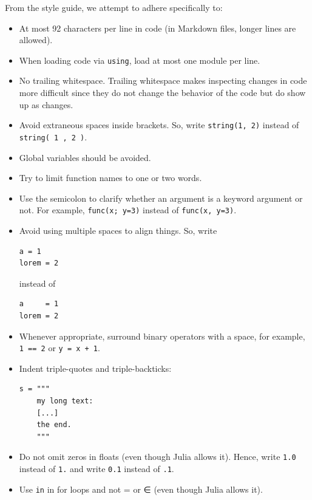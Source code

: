 \documentclass[
  notoc %
]{tufte-book}
\newcommand{\passthrough}[1]{#1}
\begin{document}
From the style guide, we attempt to adhere specifically to:

\begin{itemize}
\item
  At most 92 characters per line in code (in Markdown files, longer
  lines are allowed).
\item
  When loading code via \passthrough{\lstinline!using!}, load at most
  one module per line.
\item
  No trailing whitespace. Trailing whitespace makes inspecting changes
  in code more difficult since they do not change the behavior of the
  code but do show up as changes.
\item
  Avoid extraneous spaces inside brackets. So, write
  \passthrough{\lstinline!string(1, 2)!} instead of
  \passthrough{\lstinline!string( 1 , 2 )!}.
\item
  Global variables should be avoided.
\item
  Try to limit function names to one or two words.
\item
  Use the semicolon to clarify whether an argument is a keyword argument
  or not. For example, \passthrough{\lstinline!func(x; y=3)!} instead of
  \passthrough{\lstinline!func(x, y=3)!}.
\item
  Avoid using multiple spaces to align things. So, write

\begin{lstlisting}
a = 1
lorem = 2
\end{lstlisting}

  instead of

\begin{lstlisting}
a     = 1
lorem = 2
\end{lstlisting}
\item
  Whenever appropriate, surround binary operators with a space, for
  example, \passthrough{\lstinline!1 == 2!} or
  \passthrough{\lstinline!y = x + 1!}.
\item
  Indent triple-quotes and triple-backticks:

\begin{lstlisting}
s = """
    my long text:
    [...]
    the end.
    """
\end{lstlisting}
\item
  Do not omit zeros in floats (even though Julia allows it). Hence,
  write \passthrough{\lstinline!1.0!} instead of
  \passthrough{\lstinline!1.!} and write \passthrough{\lstinline!0.1!}
  instead of \passthrough{\lstinline!.1!}.
\item
  Use \passthrough{\lstinline!in!} in for loops and not = or ∈ (even
  though Julia allows it).
\end{itemize}
\end{document}
